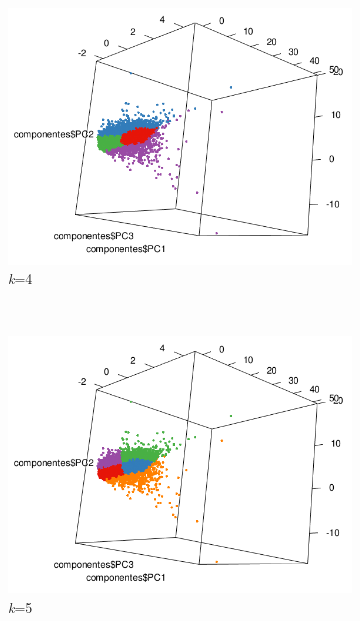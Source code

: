 \documentclass[12pt]{article}
\numberwithin{equation}{section}
\numberwithin{table}{section}
\numberwithin{figure}{section}
\begin{document}
\begin{figure}
        ~
        \begin{subfigure}[b]{0.33\textwidth}
                \includegraphics[width=1\textwidth]{imagenes/k4}
                \caption{\emph{k}=4}
        \end{subfigure}
        ~
        \begin{subfigure}[b]{0.33\textwidth}
                \includegraphics[width=1\textwidth]{imagenes/k5}
                \caption{\emph{k}=5}
        \end{subfigure}
        ~
        \begin{subfigure}[b]{0.33\textwidth}

\end{subfigure}
\end{figure}
\end{document}
